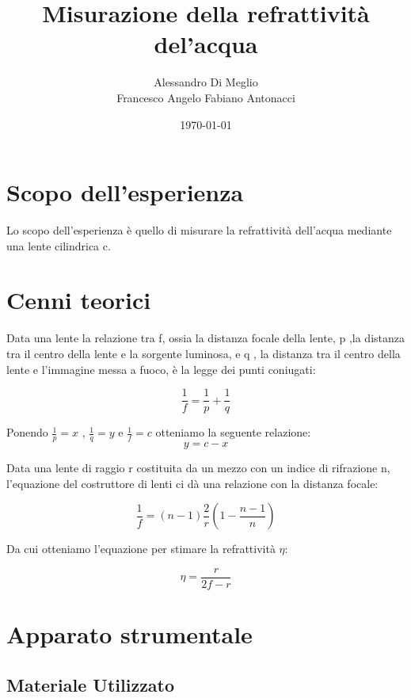 \documentclass{article}
\title{Misurazione della refrattività del'acqua}
\author{Alessandro Di Meglio \\ Francesco Angelo Fabiano Antonacci}
\date{\today}
\begin{document}
\maketitle
\section{Scopo dell'esperienza}

Lo scopo dell'esperienza è quello di misurare la refrattività  dell'acqua mediante una lente cilindrica c.

\section{Cenni teorici}

Data una lente la relazione tra f, ossia la distanza focale della lente, p ,la distanza tra il centro della lente e la sorgente luminosa, e q , la distanza tra il centro della lente e l'immagine messa a fuoco, è la legge dei punti coniugati:

\begin{equation}
\frac{1}{f}=\frac{1}{p}+\frac{1}{q}
\label{pucon}
\end{equation}

Ponendo $\frac{1}{p}=x$ ,  $\frac{1}{q}=y$ e $\frac{1}{f}=c$ otteniamo la seguente relazione:
\begin{equation}
y=c-x
\label{:)}
\end{equation}
 


Data una lente di raggio r costituita da un mezzo con un indice di rifrazione n, l'equazione del costruttore di lenti ci dà una relazione con la distanza focale:

\begin{equation}
\frac{1}{f}=(n-1)\frac{2}{r}(1-\frac{n-1}{n})
\label{lme}
\end{equation}

Da cui otteniamo l'equazione per stimare la refrattività $\eta$:

\begin{equation}
\eta=\frac{r}{2f-r}
\label{refr}
\end{equation}


\section{Apparato strumentale}

\subsection{Materiale Utilizzato}
\end{document}
